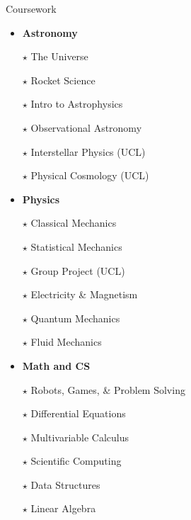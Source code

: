 \documentclass{resume} %
\newcommand{\tab}[1]{\hspace{.2667\textwidth}\rlap{#1}}
\newcommand{\itab}[1]{\hspace{0em}\rlap{#1}}
\begin{document}
\begin{rSection}{Coursework}
\begin{multicols}{3}
    \begin{itemize}[label={}]\setlength\itemsep{-6pt}
        \item \textbf{Astronomy}
        \item[$\star$] The Universe
        \item[$\star$] Rocket Science
        \item[$\star$] Intro to Astrophysics
        \item[$\star$] Observational Astronomy
        \item[$\star$] Interstellar Physics (UCL)
        \item[$\star$] Physical Cosmology (UCL)
        
        \item \textbf{Physics}
        \item[$\star$] Classical Mechanics
        \item[$\star$]  Statistical Mechanics
        \item[$\star$] Group Project (UCL)
        \item[$\star$]  Electricity \& Magnetism
        \item[$\star$] Quantum Mechanics
        \item[$\star$] Fluid Mechanics
        
        \item \textbf{Math and CS}
        \item[$\star$] Robots, Games, \& Problem Solving
        \item[$\star$] Differential Equations
        \item[$\star$] Multivariable Calculus
        \item[$\star$] Scientific Computing
        \item[$\star$] Data Structures
        \item[$\star$] Linear Algebra
        
    \end{itemize}
    \end{multicols}



\end{rSection} %
\end{document}
